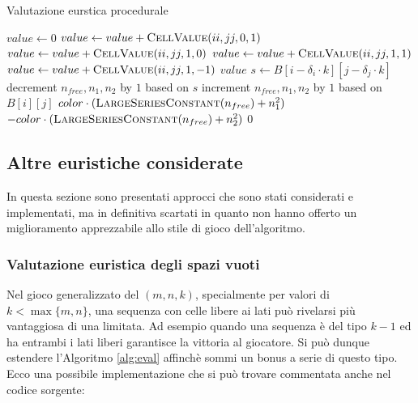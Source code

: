 \documentclass{article}
\begin{document}
\begin{algorithm}[H]
  \caption{Valutazione eurstica procedurale}
  \label{alg:eval}
  \begin{algorithmic}[0]
      \State $value \gets 0$
        \State $value \gets value + \Call{CellValue}{ii, jj, 0, 1}$
      \EndFor
        \State $value \gets value + \Call{CellValue}{ii, jj, 1, 0}$
      \EndFor
        \State $value \gets value + \Call{CellValue}{ii, jj, 1, 1}$
      \EndFor
        \State $value \gets value + \Call{CellValue}{ii, jj, 1, -1}$
      \EndFor
      \State \Return $value$
    \EndProcedure
    \Statex
       
        \State $s \gets B[i - \delta_i \cdot k][j - \delta_j \cdot k]$ 
        \State decrement $n_{free}, n_1, n_2$ by $1$ based on $s$
      \EndIf
      \State increment $n_{free}, n_1, n_2$ by $1$ based on $B[i][j]$
      \Statex
        \State \Return $color \cdot (\Call{LargeSeriesConstant}{n_{free}} + n_1^2)$
        \State \Return $-color \cdot (\Call{LargeSeriesConstant}{n_{free}} + n_2^2)$
      \Else
        \State \Return $0$
      \EndIf
    \EndProcedure
  \end{algorithmic}
\end{algorithm}

\subsection*{Altre euristiche considerate}

In questa sezione sono presentati approcci che sono stati considerati e
implementati, ma in definitiva scartati in quanto non hanno offerto un
miglioramento apprezzabile allo stile di gioco dell'algoritmo.

\subsubsection*{Valutazione euristica degli spazi vuoti}

Nel gioco generalizzato del $(m, n, k)$, specialmente per valori di $k < \max\{m,n\}$,
una sequenza con celle libere ai lati pu\`o rivelarsi pi\`u vantaggiosa di una
limitata. Ad esempio quando una sequenza \`e del tipo $k-1$ ed ha entrambi i lati liberi
garantisce la vittoria al giocatore. Si pu\`o dunque estendere l'Algoritmo
\vref{alg:eval} affinch\`e sommi un bonus a serie di questo tipo.
Ecco una possibile implementazione che si pu\`o trovare
commentata anche nel codice sorgente:
\end{document}
